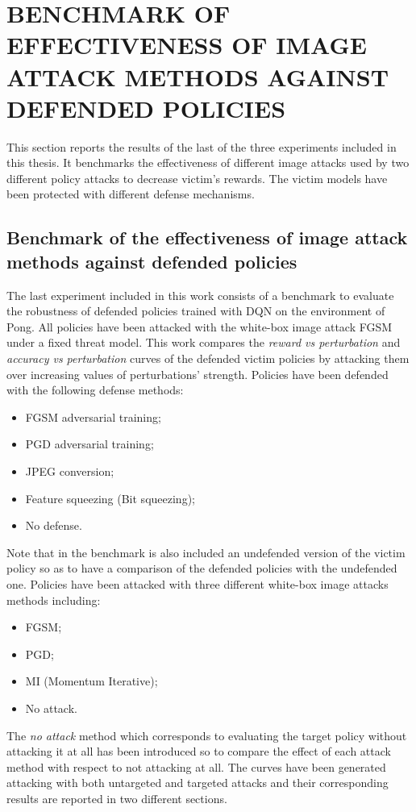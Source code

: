 \chapter{BENCHMARK OF EFFECTIVENESS OF IMAGE ATTACK METHODS AGAINST DEFENDED POLICIES}
\label{sec:exp3}

This section reports the results of the last of the three experiments included in this thesis. It benchmarks the effectiveness of different image attacks used by two different policy attacks to decrease victim's rewards. The victim models have been protected with different defense mechanisms. 

\section{Benchmark of the effectiveness of image attack methods against defended policies}
The last experiment included in this work consists of a benchmark to evaluate the robustness of defended policies trained with DQN on the environment of Pong. All policies have been attacked with the white-box image attack FGSM under a fixed threat model. This work compares the {\it reward vs perturbation} and {\it accuracy vs perturbation} curves of the defended victim policies by attacking them over increasing values of perturbations’ strength. Policies have been defended with the following defense methods:
\begin{itemize}
    \item FGSM adversarial training;
    \item PGD adversarial training;
    \item JPEG conversion;
    \item Feature squeezing (Bit squeezing);
    \item No defense.
\end{itemize}
Note that in the benchmark is also included an undefended version of the victim policy so as to have a comparison of the defended policies with the undefended one. 
Policies have been attacked with three different white-box image attacks methods including:
\begin{itemize}
    \item FGSM;
    \item PGD;
    \item MI (Momentum Iterative);
    \item No attack.
\end{itemize}
The {\it no attack} method which corresponds to evaluating the target policy without attacking it at all has been introduced so to compare the effect of each attack method with respect to not attacking at all. The curves have been generated attacking with both untargeted and targeted attacks and their corresponding results are reported in two different sections.

